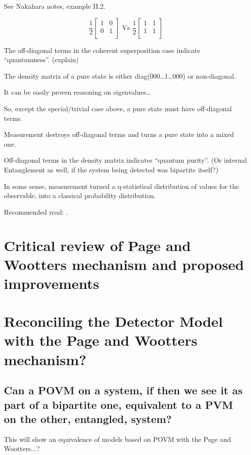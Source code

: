 \documentclass{book}
\begin{document}
See Nakahara notes, example II.2.

$$
\frac{1}{2}\begin{bmatrix}
  1 &0  \\
  0 &1  \\
\end{bmatrix}
\text{ Vs }
\frac{1}{2}\begin{bmatrix}
  1 &1  \\
  1 &1  \\
\end{bmatrix}
$$

The off-diagonal terms in the coherent superposition case indicate
``quantumness''. (explain)

\begin{remark}
  The density matrix of a pure state is either diag(000\dots1\dots000) or non-diagonal.

  It can be easily proven reasoning on eigenvalues\dots

  So, except the special/trivial case above, a pure state must have off-diagonal terms.
\end{remark}

Measurement destroys off-diagonal terms and turns a pure state into a mixed one.

Off-diagonal terms in the density matrix indicates ``quantum purity''.
(Or internal Entanglement as well, if the system being detected was bipartite itself?)

In some sense, measurement turned a q-statistical distribution of values for the observable,
into a classical probability distribution.

Recommended read: \cite{Zurek_Decoherence, Zurek_Decoherence2}.

\chapter{Critical review of Page and Wootters mechanism and proposed improvements}



\chapter{Reconciling the Detector Model with the Page and Wootters mechanism?}
\section{Can a POVM on a system, if then we see it as part of a bipartite one,
equivalent to a PVM on the other, entangled, system?}
This will show an equivalence of models based on POVM with the Page and Wootters...?
\end{document}
